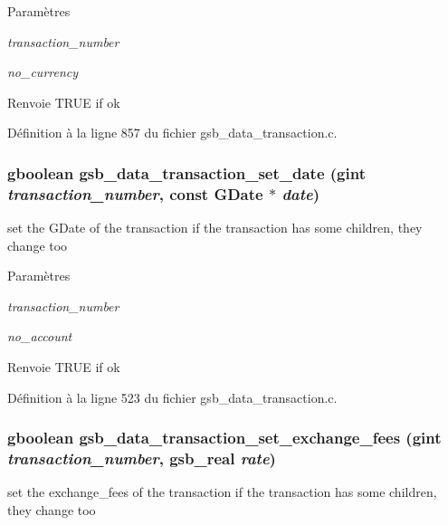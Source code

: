 \begin{DoxyParams}{Paramètres}
\item[{\em transaction\_\-number}]\item[{\em no\_\-currency}]\end{DoxyParams}
\begin{DoxyReturn}{Renvoie}
TRUE if ok 
\end{DoxyReturn}


Définition à la ligne 857 du fichier gsb\_\-data\_\-transaction.c.

\subsubsection[{gsb\_\-data\_\-transaction\_\-set\_\-date}]{\setlength{\rightskip}{0pt plus 5cm}gboolean gsb\_\-data\_\-transaction\_\-set\_\-date (gint {\em transaction\_\-number}, \/  const GDate $\ast$ {\em date})}\label{gsb__data__transaction_8h_a1e1d28bf9c59c6e0f24eaaa68769d302}
set the GDate of the transaction if the transaction has some children, they change too


\begin{DoxyParams}{Paramètres}
\item[{\em transaction\_\-number}]\item[{\em no\_\-account}]\end{DoxyParams}
\begin{DoxyReturn}{Renvoie}
TRUE if ok 
\end{DoxyReturn}


Définition à la ligne 523 du fichier gsb\_\-data\_\-transaction.c.

\subsubsection[{gsb\_\-data\_\-transaction\_\-set\_\-exchange\_\-fees}]{\setlength{\rightskip}{0pt plus 5cm}gboolean gsb\_\-data\_\-transaction\_\-set\_\-exchange\_\-fees (gint {\em transaction\_\-number}, \/  {\bf gsb\_\-real} {\em rate})}\label{gsb__data__transaction_8h_a46915d31d731950c840d3ea7b8caf226}
set the exchange\_\-fees of the transaction if the transaction has some children, they change too


